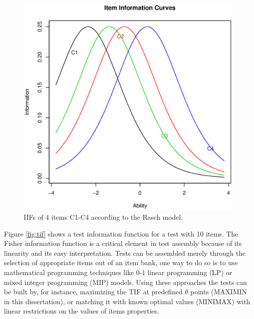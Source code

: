 \begin{figure}[H]
	\centering
	\includegraphics[scale=0.5]{iif.eps}
	\caption{IIFs of 4 items C1-C4 according to the Rasch model.}
	\label{fig:iif}
\end{figure}

Figure \ref{fig:tif} shows a test information function for a test with 10 items. The Fisher information function is a critical element in test assembly because of its linearity and its easy interpretation. Tests can be assembled merely through the selection of appropriate items out of an item bank, one way to do so is to use mathematical programming techniques like 0-1 linear programming (LP) or mixed integer programming (MIP) models. Using these approaches the tests can be built by, for instance, maximizing the TIF at predefined $\theta$ points (MAXIMIN in this dissertation), or matching it with known optimal values (MINIMAX) with linear restrictions on the values of items properties.

